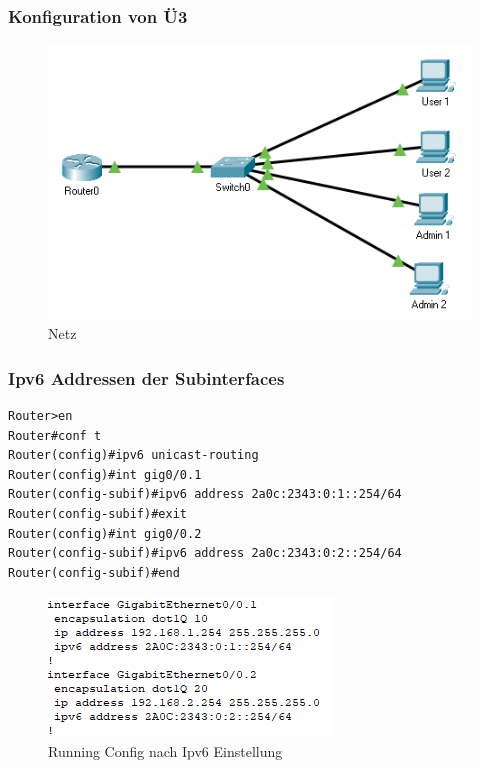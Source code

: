 \subsubsection{Konfiguration von Ü3}
\begin{figure}[!htb]
    \centering
    \includegraphics[width=\textwidth,height=.34\textwidth,keepaspectratio]{./img/build.png}
    \caption{Netz}
\end{figure}
\subsubsection{Ipv6 Addressen der Subinterfaces}
\begin{lstlisting}
Router>en
Router#conf t
Router(config)#ipv6 unicast-routing 
Router(config)#int gig0/0.1
Router(config-subif)#ipv6 address 2a0c:2343:0:1::254/64
Router(config-subif)#exit
Router(config)#int gig0/0.2
Router(config-subif)#ipv6 address 2a0c:2343:0:2::254/64
Router(config-subif)#end
\end{lstlisting}
\begin{figure}[!htb]
    \centering
    \includegraphics[width=\textwidth,height=.25\textwidth,keepaspectratio]{./img/ipv6_router.png}
    \caption{Running Config nach Ipv6 Einstellung}
\end{figure}